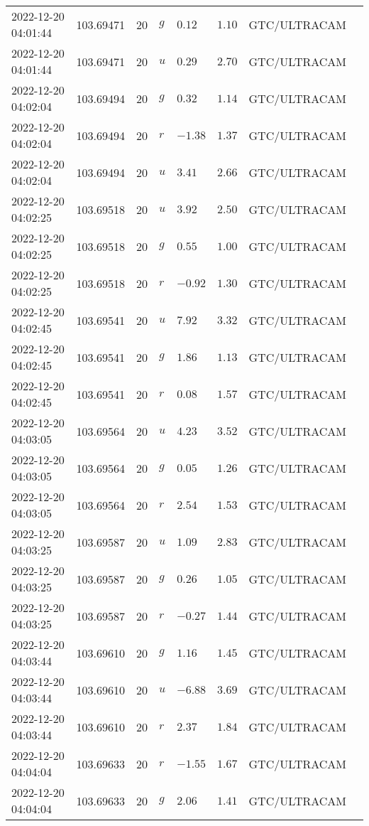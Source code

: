 \documentclass{nature_plusfigure}
\begin{document}
\begin{supplement}
\begin{center}
\begin{longtable}{llllllll}
2022-12-20 04:01:44 & 103.69471 & 20 & $g$ & $0.12$ & $1.10$ & GTC/ULTRACAM &  \\ 
2022-12-20 04:01:44 & 103.69471 & 20 & $u$ & $0.29$ & $2.70$ & GTC/ULTRACAM &  \\ 
2022-12-20 04:02:04 & 103.69494 & 20 & $g$ & $0.32$ & $1.14$ & GTC/ULTRACAM &  \\ 
2022-12-20 04:02:04 & 103.69494 & 20 & $r$ & $-1.38$ & $1.37$ & GTC/ULTRACAM &  \\ 
2022-12-20 04:02:04 & 103.69494 & 20 & $u$ & $3.41$ & $2.66$ & GTC/ULTRACAM &  \\ 
2022-12-20 04:02:25 & 103.69518 & 20 & $u$ & $3.92$ & $2.50$ & GTC/ULTRACAM &  \\ 
2022-12-20 04:02:25 & 103.69518 & 20 & $g$ & $0.55$ & $1.00$ & GTC/ULTRACAM &  \\ 
2022-12-20 04:02:25 & 103.69518 & 20 & $r$ & $-0.92$ & $1.30$ & GTC/ULTRACAM &  \\ 
2022-12-20 04:02:45 & 103.69541 & 20 & $u$ & $7.92$ & $3.32$ & GTC/ULTRACAM &  \\ 
2022-12-20 04:02:45 & 103.69541 & 20 & $g$ & $1.86$ & $1.13$ & GTC/ULTRACAM &  \\ 
2022-12-20 04:02:45 & 103.69541 & 20 & $r$ & $0.08$ & $1.57$ & GTC/ULTRACAM &  \\ 
2022-12-20 04:03:05 & 103.69564 & 20 & $u$ & $4.23$ & $3.52$ & GTC/ULTRACAM &  \\ 
2022-12-20 04:03:05 & 103.69564 & 20 & $g$ & $0.05$ & $1.26$ & GTC/ULTRACAM &  \\ 
2022-12-20 04:03:05 & 103.69564 & 20 & $r$ & $2.54$ & $1.53$ & GTC/ULTRACAM &  \\ 
2022-12-20 04:03:25 & 103.69587 & 20 & $u$ & $1.09$ & $2.83$ & GTC/ULTRACAM &  \\ 
2022-12-20 04:03:25 & 103.69587 & 20 & $g$ & $0.26$ & $1.05$ & GTC/ULTRACAM &  \\ 
2022-12-20 04:03:25 & 103.69587 & 20 & $r$ & $-0.27$ & $1.44$ & GTC/ULTRACAM &  \\ 
2022-12-20 04:03:44 & 103.69610 & 20 & $g$ & $1.16$ & $1.45$ & GTC/ULTRACAM &  \\ 
2022-12-20 04:03:44 & 103.69610 & 20 & $u$ & $-6.88$ & $3.69$ & GTC/ULTRACAM &  \\ 
2022-12-20 04:03:44 & 103.69610 & 20 & $r$ & $2.37$ & $1.84$ & GTC/ULTRACAM &  \\ 
2022-12-20 04:04:04 & 103.69633 & 20 & $r$ & $-1.55$ & $1.67$ & GTC/ULTRACAM &  \\ 
2022-12-20 04:04:04 & 103.69633 & 20 & $g$ & $2.06$ & $1.41$ & GTC/ULTRACAM &  \\ 

\end{longtable}
\end{center}
\end{supplement}
\end{document}

